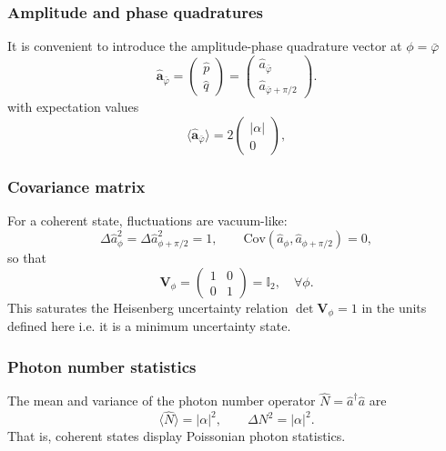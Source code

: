 \subsubsection*{Amplitude and phase quadratures}

It is convenient to introduce the amplitude-phase quadrature vector at $\phi = \bar{\varphi}$
\begin{equation}
\hat{\mathbf a}_{\bar{\varphi}} =
\begin{pmatrix}
\hat{p} \\[2pt]
\hat{q}
\end{pmatrix}
=
\begin{pmatrix}
\hat{a}_{\bar{\varphi}} \\[2pt]
\hat{a}_{\bar{\varphi}+\pi/2}
\end{pmatrix}.
\end{equation}
with expectation values
\begin{equation}
\langle \hat{\mathbf a}_{\bar{\varphi}} \rangle
=
2\begin{pmatrix}
|\alpha| \\[2pt]
0
\end{pmatrix},
\end{equation}



\subsubsection*{Covariance matrix}
For a coherent state, fluctuations are vacuum-like:
\begin{equation}
\Delta \hat{a}_\phi^2 = \Delta \hat{a}_{\phi+\pi/2}^2 = 1,
\qquad
\mathrm{Cov}(\hat{a}_\phi,\hat{a}_{\phi+\pi/2}) = 0,
\end{equation}
so that
\begin{equation}
\mathbf V_\phi =
\begin{pmatrix}
1 & 0\\
0 & 1
\end{pmatrix}
= \mathbb{I}_2,
\quad \forall \phi .
\label{II.CS.3}
\end{equation}
This saturates the Heisenberg uncertainty relation $\det \mathbf V_\phi = 1$ in the units defined here i.e. it is a minimum uncertainty state. 

\subsubsection*{Photon number statistics}

The mean and variance of the photon number operator $\hat{N}=\hat{a}^\dagger\hat{a}$ are
\begin{equation}
\langle \hat{N} \rangle = |\alpha|^2,
\qquad
\Delta N^2 = |\alpha|^2.
\label{II.19}
\end{equation}
That is, coherent states display Poissonian photon statistics.


